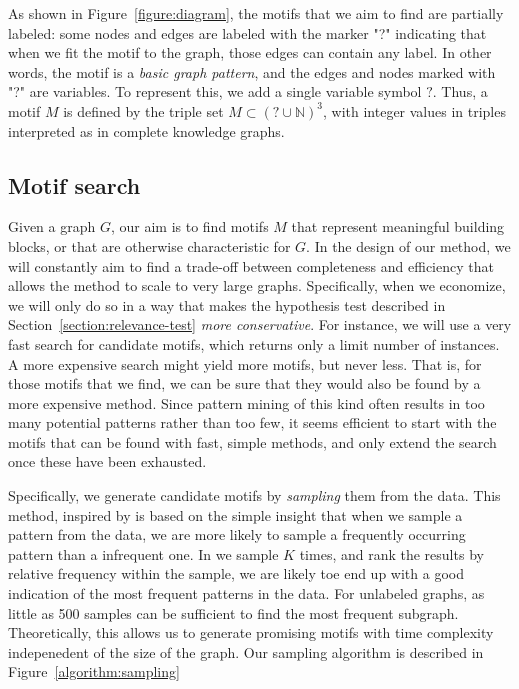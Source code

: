 \documentclass[11pt]{article}
\newcommand{\N}{{\mathbb N}}
\begin{document}
As shown in Figure~\ref{figure:diagram}, the motifs that we aim to find are partially labeled: some nodes and edges are labeled with the marker "?" indicating that when we fit the motif to the graph, those edges can contain any label. In other words, the motif is a \emph{basic graph pattern}, and the edges and nodes marked with "?" are variables. To represent this, we add a single variable symbol $?$. Thus, a motif $M$ is defined by the triple set $M \subset (? \cup \N) ^3$, with integer values in triples interpreted as in complete knowledge graphs.

\subsection{Motif search}

Given a graph $G$, our aim is to find motifs $M$ that represent meaningful building blocks, or that are otherwise characteristic for $G$. In the design of our method, we will constantly aim to find a trade-off between completeness and efficiency that allows the method to scale to very large graphs. Specifically, when we economize, we will only do so in a way that makes the hypothesis test described in Section~\ref{section:relevance-test} \emph{more conservative}. For instance, we will use a very fast search for candidate motifs, which returns only a limit number of instances. A more expensive search might yield more motifs, but never less. That is, for those motifs that we find, we can be sure that they would also be found by a more expensive method. Since pattern mining of this kind often results in too many potential patterns rather than too few, it seems efficient to start with the motifs that can be found with fast, simple methods, and only extend the search once these have been exhausted.

Specifically, we generate candidate motifs by \emph{sampling} them from the data. This method, inspired by \cite{kashtan2004efficient} is based on the simple insight that when we sample a pattern from the data, we are more likely to sample a frequently occurring pattern than a infrequent one. In we sample $K$ times, and rank the results by relative frequency within the sample, we are likely toe end up with a good indication of the most frequent patterns in the data. For unlabeled graphs, as little as 500 samples can be sufficient to find the most frequent subgraph.
Theoretically, this allows us to generate promising motifs with time complexity indepenedent of the size of the graph. Our sampling algorithm is described in Figure~\ref{algorithm:sampling}
\end{document}
